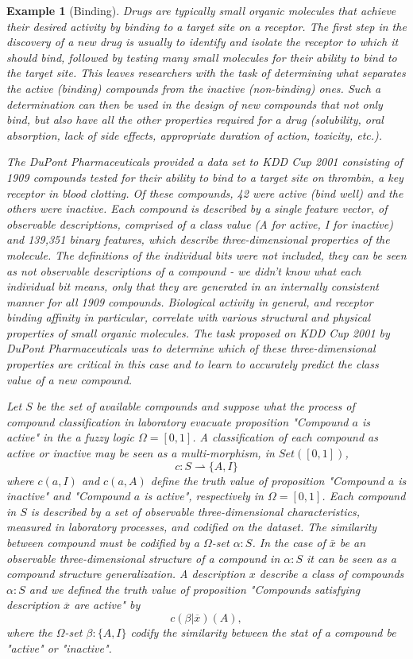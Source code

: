 \documentclass[oribibl]{llncs}
\newtheorem{exam}{Example}
\begin{document}
\begin{exam}[Binding]
Drugs are typically small organic molecules that achieve their desired
activity by binding to a target site on a receptor. The first step in
the discovery of a new drug is usually to identify and isolate the
receptor to which it should bind, followed by testing many small
molecules for their ability to bind to the target site. This leaves
researchers with the task of determining what separates the active
(binding) compounds from the inactive (non-binding) ones.  Such a
determination can then be used in the design of new compounds that not
only bind, but also have all the other properties required for a drug
(solubility, oral absorption, lack of side effects, appropriate duration
of action, toxicity, etc.).

The DuPont Pharmaceuticals provided a data set to KDD Cup 2001 consisting of 1909 compounds tested for their ability to bind to a target site on thrombin, a key receptor in blood clotting. Of these compounds, 42
were active (bind well) and the others were inactive. Each compound is
described by a single feature vector, of observable descriptions, comprised of a class value (A for
active, I for inactive) and 139,351 binary features, which describe
three-dimensional properties of the molecule. The definitions of the
individual bits were not included, they can be seen as not observable descriptions of a compound - we didn't know what each individual
bit means, only that they are generated in an internally consistent
manner for all 1909 compounds. Biological activity in general, and
receptor binding affinity in particular, correlate with various
structural and physical properties of small organic molecules. The task
proposed on KDD Cup 2001 by DuPont Pharmaceuticals  was to determine which of these three-dimensional properties are critical in this case and to learn to accurately predict the class value of a new compound.

Let $S$ be the set of available compounds and suppose what the process of compound classification in laboratory evacuate proposition "Compound $a$ is active" in the a fuzzy logic $\Omega=[0,1]$. A classification of each compound as active or inactive may be seen as a multi-morphism, in $Set([0,1])$,
\[
c:S\rightharpoonup\{A,I\}
\]
where $c(a,I)$ and $c(a,A)$ define the truth value of proposition "Compound $a$ is inactive" and "Compound $a$ is active", respectively in $\Omega=[0,1]$. Each compound in $S$ is described by a set of observable three-dimensional characteristics, measured in laboratory processes, and codified on the dataset. The similarity between compound must be codified by a $\Omega$-set $\alpha:S$. In the case of $\bar{x}$ be an observable three-dimensional structure of a compound in $\alpha:S$ it can be seen as a compound structure generalization. A description $x$ describe a class of compounds $\alpha:S$ and we defined the truth value of proposition "Compounds satisfying description $\overline{x}$ are active" by
\[
c(\beta|\overline{x})(A),
\]
where the $\Omega$-set $\beta:\{A,I\}$ codify the similarity between the stat of a compound be "active" or "inactive".
\end{exam}
\end{document}
